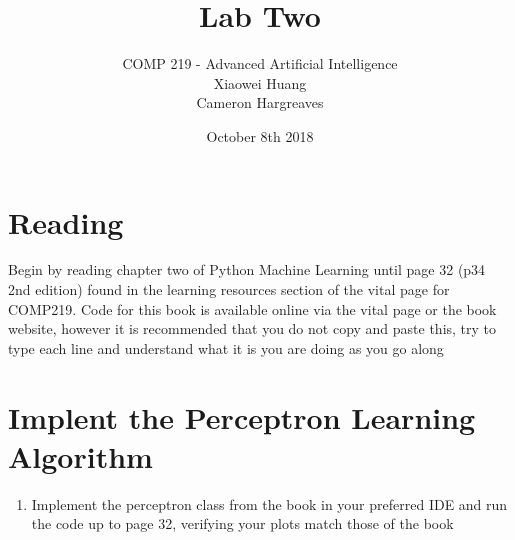 \documentclass[12pt]{article}
\begin{document}


\date{October 8th 2018}
 
 
\title{Lab Two}%
\author{COMP 219 - Advanced Artificial Intelligence \\
		Xiaowei Huang \\ 
		Cameron Hargreaves\\}
 
\maketitle

\section{Reading}
Begin by reading chapter two of Python Machine Learning until page 32 (p34 2nd edition) found in the learning resources section of the vital page for COMP219. Code for this book is available online via the vital page or the book website, however it is recommended that you do not copy and paste this, try to type each line and understand what it is you are doing as you go along

\section{Implent the Perceptron Learning Algorithm}
\begin{enumerate}
\item Implement the perceptron class from the book in your preferred IDE and run the code up to page 32, verifying your plots match those of the book
\end{enumerate}
\end{document}
